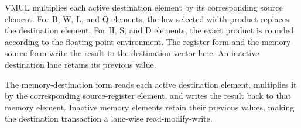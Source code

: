 VMUL multiplies each active destination element by its corresponding source
element. For B, W, L, and Q elements, the low selected-width product replaces
the destination element. For H, S, and D elements, the exact product is
rounded according to the floating-point environment. The register form and
the memory-source form write the result to the destination vector lane. An
inactive destination lane retains its previous value.

The memory-destination form reads each active destination element, multiplies
it by the corresponding source-register element, and writes the result back
to that memory element. Inactive memory elements retain their previous values,
making the destination transaction a lane-wise read-modify-write.
